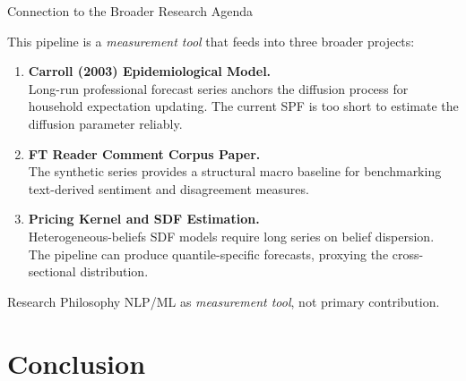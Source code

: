 \documentclass[aspectratio=169, 11pt]{beamer}
\begin{document}
\begin{frame}{Connection to the Broader Research Agenda}

This pipeline is a \emph{measurement tool} that feeds into three broader projects:

\vspace{0.2cm}
\begin{enumerate}\itemsep4pt
  \item \textbf{Carroll (2003) Epidemiological Model.} \\
        Long-run professional forecast series anchors the diffusion process for household expectation updating. The current SPF is too short to estimate the diffusion parameter reliably.

  \item \textbf{FT Reader Comment Corpus Paper.} \\
        The synthetic series provides a structural macro baseline for benchmarking text-derived sentiment and disagreement measures.

  \item \textbf{Pricing Kernel and SDF Estimation.} \\
        Heterogeneous-beliefs SDF models require long series on belief dispersion. The pipeline can produce quantile-specific forecasts, proxying the cross-sectional distribution.
\end{enumerate}

\vspace{0.15cm}
\begin{alertblock}{Research Philosophy}
NLP/ML as \emph{measurement tool}, not primary contribution.
\end{alertblock}

\end{frame}

\section{Conclusion}
\end{document}
